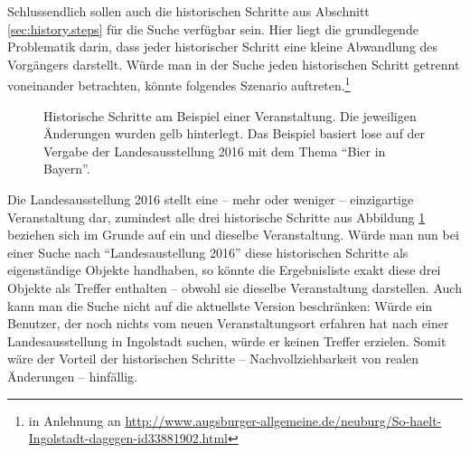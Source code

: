 Schlussendlich sollen auch die historischen Schritte aus Abschnitt \ref{sec:history.steps} für die Suche verfügbar sein. Hier liegt die grundlegende Problematik darin, dass jeder historischer Schritt eine kleine Abwandlung des Vorgängers darstellt. Würde man in der Suche jeden historischen Schritt getrennt voneinander betrachten, könnte folgendes Szenario auftreten.\footnote{in Anlehnung an \url{http://www.augsburger-allgemeine.de/neuburg/So-haelt-Ingolstadt-dagegen-id33881902.html}}

\begin{figure}[ht!]
\begin{margincap}
	\centering
	\caption[Historische Schritte am Beispiel einer Veranstaltung]{Historische Schritte am Beispiel einer Veranstaltung. Die jeweiligen Änderungen wurden gelb hinterlegt. Das Beispiel basiert lose auf der Vergabe der Landesausstellung 2016 mit dem Thema \enquote{Bier in Bayern}.}
	\label{fig:historic_steps_search_problem}
\end{margincap}
\end{figure}

Die Landesausstellung 2016 stellt eine -- mehr oder weniger -- einzigartige Veranstaltung dar, zumindest alle drei historische Schritte aus Abbildung \ref{fig:historic_steps_search_problem} beziehen sich im Grunde auf ein und dieselbe Veranstaltung. Würde man nun bei einer Suche nach \enquote{Landesaustellung 2016} diese historischen Schritte als eigenständige Objekte handhaben, so könnte die Ergebnisliste exakt diese drei Objekte als Treffer enthalten -- obwohl sie dieselbe Veranstaltung darstellen. Auch kann man die Suche nicht auf die aktuellste Version beschränken: Würde ein Benutzer, der noch nichts vom neuen Veranstaltungsort erfahren hat nach einer Landesausstellung in Ingolstadt suchen, würde er keinen Treffer erzielen. Somit wäre der Vorteil der historischen Schritte -- Nachvollziehbarkeit von realen Änderungen -- hinfällig.

